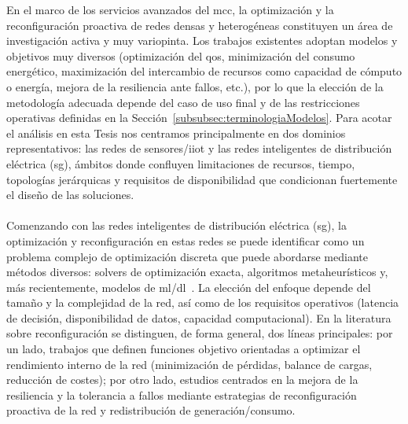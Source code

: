 En el marco de los servicios avanzados del \gls{mcc}, la optimización y la reconfiguración proactiva de redes densas y heterogéneas constituyen un área de investigación activa y muy variopinta. Los trabajos existentes adoptan modelos y objetivos muy diversos (optimización del \gls{qos}, minimización del consumo energético, maximización del intercambio de recursos como capacidad de cómputo o energía, mejora de la resiliencia ante fallos, etc.), por lo que la elección de la metodología adecuada depende del caso de uso final y de las restricciones operativas definidas en la Sección~\ref{subsubsec:terminologiaModelos}. Para acotar el análisis en esta Tesis nos centramos principalmente en dos dominios representativos: las redes de sensores/\gls{iiot} y las redes inteligentes de distribución eléctrica (\gls{sg}), ámbitos donde confluyen limitaciones de recursos, tiempo, topologías jerárquicas y requisitos de disponibilidad que condicionan fuertemente el diseño de las soluciones.\\
\\ %
Comenzando con las redes inteligentes de distribución eléctrica (\gls{sg}), la optimización y reconfiguración en estas redes se puede identificar como un problema complejo de optimización discreta que puede abordarse mediante métodos diversos: solvers de optimización exacta, algoritmos metaheurísticos y, más recientemente, modelos de \gls{ml}/\gls{dl}~\cite{bhattarai2019big,koshy2021smart,kotsiopoulos2021machine}. La elección del enfoque depende del tamaño y la complejidad de la red, así como de los requisitos operativos (latencia de decisión, disponibilidad de datos, capacidad computacional). En la literatura sobre reconfiguración se distinguen, de forma general, dos líneas principales: por un lado, trabajos que definen funciones objetivo orientadas a optimizar el rendimiento interno de la red (minimización de pérdidas, balance de cargas, reducción de costes); por otro lado, estudios centrados en la mejora de la resiliencia y la tolerancia a fallos mediante estrategias de reconfiguración proactiva de la red y redistribución de generación/consumo.\\
\\
